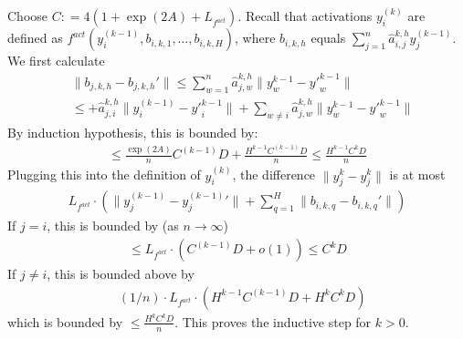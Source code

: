 \documentclass[11pt,a4paper]{article}
\begin{document}
Choose $C : = 4(1 + \exp(2A) + L_{f^{act}})$. 
Recall that activations $y_i^{(k)}$ are defined as $f^{act}(y_i^{(k-1)}, b_{i,k,1}, \dots, b_{i,k,H})$, where $b_{i,k,h}$ equals $\sum_{j=1}^n \hat{a}_{i,j}^{k,h} y_j^{(k-1)}$.
We first calculate
\begin{align*}
& \|b_{j,k,h} - b_{j,k,h}'\|  \leq \sum_{w=1}^n \hat{a}_{j,w}^{k,h} \|y_w^{k-1} - {y'}_w^{k-1}\|
\\
& \leq + \hat{a}_{j,i}^{k,h} \|y_i^{(k-1)} - {y'}_i^{k-1}\|  + \sum_{w \neq i} \hat{a}_{j,w}^{k,h} \|y_w^{k-1} - {y'}_w^{k-1}\| 
\end{align*}
By induction hypothesis, this is bounded by:
\begin{align*}
\leq \frac{\exp(2A)}{n}  C^{(k-1)} D + \frac{H^{k-1}C^{(k-1)}D}{n} \leq \frac{H^{k-1} C^{k} D}{n}
\end{align*}
Plugging this into the definition of $y_i^{(k)}$, the difference $\|y_j^k - {y_j^k}\|$ is at most
\begin{align*}
	L_{f^{act}} \cdot \left(\|y_j^{(k-1)}-{y_j^{(k-1)}}'\| + \sum_{q=1}^H \|b_{i,k,q} - b_{i,k,q}'\|\right)
\end{align*}
If $j= i$, this is bounded by (as $n \rightarrow \infty$)
\begin{align*}
\leq L_{f^{act}} \cdot \left(C^{(k-1)}D + o(1)\right) \leq C^{k}D
\end{align*}
If $j\neq i$, this is bounded above by
\begin{align*}
  &  (1/n) \cdot L_{f^{act}} \cdot \left(H^{k-1} C^{(k-1)}D + H^{k} C^{k} D\right)
\end{align*} 
which is bounded by $\leq  \frac{H^{k} C^{k} D}{n}$.
This proves the inductive step for $k>0$.


\end{document}
